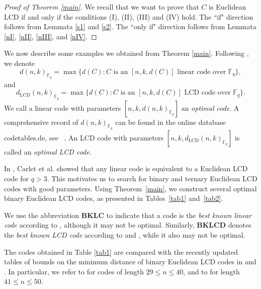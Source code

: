 \documentclass[a4paper,12pt]{article}
\begin{document}
\begin{proof}[Proof of Theorem \ref{main}] We recall that we want to prove that $C$ is Euclidean LCD if and only if the conditions (I), (II), (III) and (IV) hold. The ``if" direction follows from Lemmata \ref{s1} and \ref{s2}. The ``only if" direction follows from Lemmata \ref{nI}, \ref{nII}, \ref{nIII}, and \ref{nIV}.
\end{proof}


We now describe some examples we obtained from Theorem \ref{main}. Following \cite{wang2024}, we denote
\[
d(n, k)_{ \mathbb{F}_q } = \max\{ d(C) : C \text{ is an } [n, k, d(C)] \text{ linear code over } \mathbb{F}_q \},
\]
and
\[
d_{\mathrm{LCD}}(n, k)_{ \mathbb{F}_q } = \max\{ d(C) : C \text{ is an } [n, k, d(C)] \text{ LCD code over } \mathbb{F}_q \}.
\]
We call a linear code with parameters $[n, k, d(n, k)_{\mathbb{F}_q}]$ an \emph{optimal code}. A comprehensive record of $d(n, k)_{\mathbb{F}_q}$   can be found in the online database codetables.de, see ~\cite{grassltable}. An LCD code with parameters $[n, k, d_{\mathrm{LCD}}(n, k)_{\mathbb{F}_q}]$ is called an \emph{optimal LCD code}.










In \cite{carlet2018}, Carlet et al. showed that any linear code is equivalent to a Euclidean LCD code for $q > 3$. This motivates us to search for binary and ternary Euclidean LCD codes with good parameters. 
Using Theorem~\ref{main}, we construct several optimal binary Euclidean LCD codes, as presented in Tables~\ref{tab1} and~\ref{tab2}. 



We use the abbreviation \textbf{BKLC} to indicate that a code is the \emph{best known linear code} according to \cite{grassltable}, although it may not be optimal. Similarly, \textbf{BKLCD} denotes the \emph{best known LCD code} according to \cite{li2024} and \cite{wang2024}, while it also may not be optimal. 



The  codes obtained in Table \ref{tab1} are compared with the recently updated tables of bounds on the minimum distance of binary Euclidean LCD codes in \cite{li2024} and \cite{wang2024}. In particular, we refer to \cite[Tables~4~and~5]{li2024} for codes of length $29 \le n \le 40$, and to \cite[Table~6]{wang2024} for length $41 \le n \le 50$.
\end{document}
